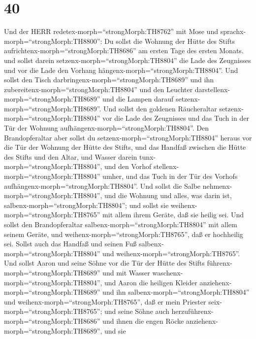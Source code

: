 \hypertarget{section-39}{%
\section{40}\label{section-39}}

 Und der HERR redetex-morph=``strongMorph:TH8762'' mit Mose
und sprachx-morph=``strongMorph:TH8800'':  Du sollst die
Wohnung der Hütte des Stifts aufrichtenx-morph=``strongMorph:TH8686'' am
ersten Tage des ersten Monats.  und sollst darein
setzenx-morph=``strongMorph:TH8804'' die Lade des Zeugnisses und vor die
Lade den Vorhang hängenx-morph=``strongMorph:TH8804''.  Und
sollst den Tisch darbringenx-morph=``strongMorph:TH8689'' und ihn
zubereitenx-morph=``strongMorph:TH8804'' und den Leuchter
darstellenx-morph=``strongMorph:TH8689'' und die Lampen darauf
setzenx-morph=``strongMorph:TH8689''.  Und sollst den
goldenen Räucheraltar setzenx-morph=``strongMorph:TH8804'' vor die Lade
des Zeugnisses und das Tuch in der Tür der Wohnung
aufhängenx-morph=``strongMorph:TH8804''.  Den
Brandopferaltar aber sollst du setzenx-morph=``strongMorph:TH8804''
heraus vor die Tür der Wohnung der Hütte des Stifts,  und
das Handfaß zwischen die Hütte des Stifts und den Altar, und Wasser
darein tunx-morph=``strongMorph:TH8804'',  und den Vorhof
stellenx-morph=``strongMorph:TH8804'' umher, und das Tuch in der Tür des
Vorhofs aufhängenx-morph=``strongMorph:TH8804''.  Und sollst
die Salbe nehmenx-morph=``strongMorph:TH8804'', und die Wohnung und
alles, was darin ist, salbenx-morph=``strongMorph:TH8804''; und sollst
sie weihenx-morph=``strongMorph:TH8765'' mit allem ihrem Geräte, daß sie
heilig sei.  Und sollst den Brandopferaltar
salbenx-morph=``strongMorph:TH8804'' mit allem seinem Geräte, und
weihenx-morph=``strongMorph:TH8765'', daß er hochheilig sei.
 Sollst auch das Handfaß und seinen Fuß
salbenx-morph=``strongMorph:TH8804'' und
weihenx-morph=``strongMorph:TH8765''.  Und sollst Aaron und
seine Söhne vor die Tür der Hütte des Stifts
führenx-morph=``strongMorph:TH8689'' und mit Wasser
waschenx-morph=``strongMorph:TH8804'',  und Aaron die
heiligen Kleider anziehenx-morph=``strongMorph:TH8689'' und ihn
salbenx-morph=``strongMorph:TH8804'' und
weihenx-morph=``strongMorph:TH8765'', daß er mein Priester
seix-morph=``strongMorph:TH8765'';  und seine Söhne auch
herzuführenx-morph=``strongMorph:TH8686'' und ihnen die engen Röcke
anziehenx-morph=``strongMorph:TH8689'',  und sie
